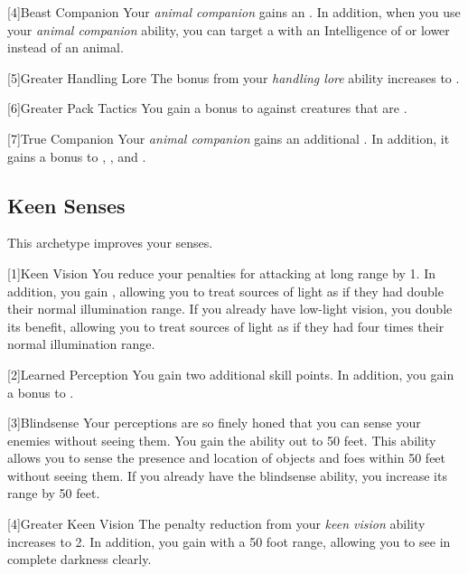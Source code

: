         [4]{Beast Companion} Your \textit{animal companion} gains an .
        In addition, when  you use your \textit{animal companion} ability,
            you can target a   with an Intelligence of  or lower instead of an animal.

        [5]{Greater Handling Lore} The bonus from your \textit{handling lore} ability increases to .

        [6]{Greater Pack Tactics} You gain a  bonus to  against creatures that are .

        [7]{True Companion} Your \textit{animal companion} gains an additional .
        In addition, it gains a  bonus to , , and .

    \subsection{Keen Senses}
        This archetype improves your senses.

        [1]{Keen Vision}
        You reduce your  penalties for attacking at long range by 1.
        In addition, you gain , allowing you to treat sources of light as if they had double their normal illumination range.
        If you already have low-light vision, you double its benefit, allowing you to treat sources of light as if they had four times their normal illumination range.

        [2]{Learned Perception} You gain two additional skill points.
        In addition, you gain a  bonus to .

        [3]{Blindsense}
        Your perceptions are so finely honed that you can sense your enemies without seeing them.
        You gain the  ability out to 50 feet.
        This ability allows you to sense the presence and location of objects and foes within 50 feet without seeing them.
        If you already have the blindsense ability, you increase its range by 50 feet.

        [4]{Greater Keen Vision} The penalty reduction from your \textit{keen vision} ability increases to 2.
        In addition, you gain  with a 50 foot range, allowing you to see in complete darkness clearly.

